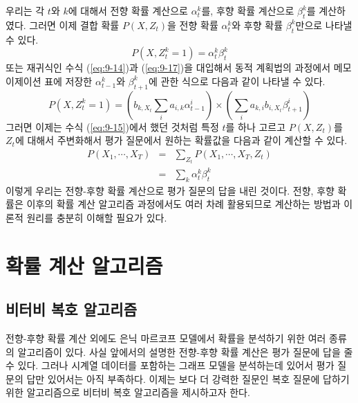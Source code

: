 \documentclass[a4paper]{oblivoir}
\begin{document}
우리는 각 $t$와 $k$에 대해서 전향 확률 계산으로 $\alpha_{t}^{k}$를, 후향 확률 계산으로 $\beta_{t}^{k}$를 계산하였다. 그러면 이제 결합 확률 $P(X,Z_{t})$을 전향 확률 $\alpha_{t}^{k}$와 후향 확률 $\beta_{t}^{k}$만으로 나타낼 수 있다. 
\begin{equation}
P(X,Z_{t}^{k}=1) = \alpha_{t}^{k} \beta_{t}^{k} 
\label{eq:9-19}
\end{equation} 
또는 재귀식인 수식 (\ref{eq:9-14})과 (\ref{eq:9-17})을 대입해서 동적 계획법의 과정에서 메모이제이션 표에 저장한 $\alpha_{t-1}^{k}$와 $\beta_{t+1}^{k}$에 관한 식으로 다음과 같이 나타낼 수 있다.  
\begin{equation}
P(X,Z_{t}^{k}=1) = (b_{k,X_{t}} \sum_{i} a_{i,k} \alpha_{t-1}^{i}) \times (\sum_{i} a_{k,i} b_{i,X_{t}} \beta_{t+1}^{i})
\label{eq:9-20}
\end{equation}  
그러면 이제는 수식 (\ref{eq:9-15})에서 했던 것처럼 특정 $t$를 하나 고르고 $P(X,Z_{t})$를 $Z_{t}$에 대해서 주변화해서 평가 질문에서 원하는 확률값을 다음과 같이 계산할 수 있다.  
\begin{eqnarray}
P(X_{1},\cdots,X_{T}) & = & \sum_{Z_{t}} P(X_{1},\cdots,X_{T},Z_{t})  \nonumber \\
& = & \sum_{k} \alpha_{t}^{k} \beta_{t}^{k} \label{eq:9-21} 
\end{eqnarray}
이렇게 우리는 전향-후향 확률 계산으로 평가 질문의 답을 내린 것이다. 전향, 후향 확률은 이후의 확률 계산 알고리즘 과정에서도 여러 차례 활용되므로 계산하는 방법과 이론적 원리를 충분히 이해할 필요가 있다.

\section{확률 계산 알고리즘}

\subsection{비터비 복호 알고리즘}

전향-후향 확률 계산 외에도 은닉 마르코프 모델에서 확률을 분석하기 위한 여러 종류의 알고리즘이 있다. 사실 앞에서의 설명한 전향-후향 확률 계산은 평가 질문에 답을 줄 수 있다. 그러나 시계열 데이터를 포함하는 그래프 모델을 분석하는데 있어서 평가 질문의 답만 있어서는 아직 부족하다. 이제는 보다 더 강력한 질문인 복호 질문에 답하기 위한 알고리즘으로 비터비 복호 알고리즘을 제시하고자 한다. \\
\end{document}
